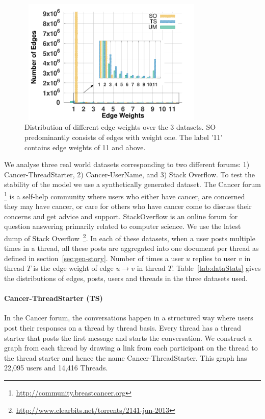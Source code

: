 \documentclass{sig-alternate}
\newcommand{\comment}[1]{\textcolor{red}{[#1]}}
\begin{document}
\begin{figure}
\begin{center}
\includegraphics[height=6cm,width=9cm]{figs/datastats.pdf}
\end{center}
\vspace*{-2\baselineskip}
\caption{\small{Distribution of different edge weights over the 3 datasets. SO 
predominantly consists of edges with weight one. 
The label '11' contains edge weights of 11 and above.}}
\label{fig:EdgeDistribution}
\vspace*{-1.5\baselineskip}
\end{figure}
We analyse three real world datasets corresponding to two different forums: 1)
Cancer-ThreadStarter, 2) Cancer-UserName, and 3) Stack Overflow. To test the
stability of the model we use a synthetically generated dataset. 
The Cancer forum \footnote{\url{http://community.breastcancer.org}} 
is a self-help community where users who either have cancer, are 
concerned they may have cancer, or care for others who have cancer 
come to discuss their concerns and get advice and support.
StackOverflow is an
online forum for question answering primarily related to computer science. We
use the latest dump of Stack
Overflow~\footnote{\url{http://www.clearbits.net/torrents/2141-jun-2013}}. In
each of these datasets, when a user posts multiple times in a thread, all these
posts are aggregated into one document per thread as defined in
section~\ref{sec:gen-story}.
Number of times a user $u$ replies to user $v$ in thread $T$ is the edge weight
of edge $u\rightarrow v$ in thread $T$.
Table~\ref{tab:dataStats} gives the distributions of edges, posts, users and
threads in the three datasets used. 
\vspace*{-0.5\baselineskip}
\paragraph{Cancer-ThreadStarter (TS)} In the Cancer forum, the conversations happen
in a structured way where users post their responses on a thread by thread
basis. Every thread has a thread starter that posts the first message and
starts the conversation. 
We construct a graph from each thread by drawing a link from each participant on 
the thread to the thread starter and hence the name Cancer-ThreadStarter.
This graph has 22,095 users and 14,416 Threads. 
\vspace*{-0.5\baselineskip}
\end{document}
